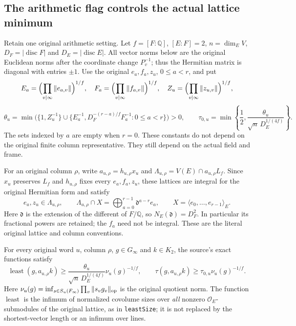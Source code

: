 \subsection{The arithmetic flag controls the actual lattice minimum}
\label{global-gram-arithmetic-minimum}

Retain one original arithmetic setting.  Let $f=[F:\mathbb Q]$,
$[E:F]=2$, $n=\dim_E V$, $D_F=|\operatorname{disc}F|$ and
$D_E=|\operatorname{disc}E|$.  All vector norms below are the
original Euclidean norms after the coordinate change $P_v^{-1}$;
thus the Hermitian matrix is diagonal with entries $\pm1$.
Use the original $e_a,f_a,z_u$, $0\le a<r$, and put
\[
 E_a=\Bigl(\prod_{v\mid\infty}\|e_{a,v}\|\Bigr)^{1/f},\quad
 F_a=\Bigl(\prod_{v\mid\infty}\|f_{a,v}\|\Bigr)^{1/f},\quad
 Z_u=\Bigl(\prod_{v\mid\infty}\|z_{u,v}\|\Bigr)^{1/f},
\]
\begin{equation}\label{global-gram-minimum-constant}
 \theta_u=\min\bigl(\{1,Z_u^{-1}\}\cup
    \{E_a^{-1},D_F^{-(r-a)/f}F_a^{-1}:0\le a<r\}\bigr)>0,
 \qquad
 \tau_{0,u}=\min\left\{\frac12,
              \frac{\theta_u}{\sqrt n\,D_E^{1/(4f)}}\right\}.
\end{equation}
The sets indexed by $a$ are empty when $r=0$.  These constants
do not depend on the original finite column representative.
They still depend on the actual field and frame.

For an original column $\rho$, write
$a_{u,\rho}=h_{u,\rho}x_u$ and
$\Lambda_{u,\rho}=V(E)\cap a_{u,\rho}L_f$.  Since $x_u$ preserves
$L_f$ and $h_{u,\rho}$ fixes every $e_a,f_a,z_u$, these lattices
are integral for the original Hermitian form and satisfy
\begin{equation}\label{global-gram-minimum-flag}
 e_a,z_u\in\Lambda_{u,\rho},\qquad
 \Lambda_{u,\rho}\cap X=\bigoplus_{a=0}^{r-1}
        \mathfrak d^{a-r}e_a,\qquad X=\langle e_0,\ldots,e_{r-1}\rangle_E.
\end{equation}
Here $\mathfrak d$ is the extension of the different of $F/\mathbb Q$,
so $N_E(\mathfrak d)=D_F^2$.  In particular its fractional powers
are retained; the $f_a$ need not be integral.
These are the literal original lattice and column conventions.
\cite{global-gram-minimum-source}

\begin{theorem}
\label{global-gram-actual-minimum-theorem}
For every original word $u$, column $\rho$, $g\in G_\infty$ and
$k\in K_2$, the source's exact functions satisfy
\begin{equation}\label{global-gram-actual-minimum}
 \operatorname{least}(g,a_{u,\rho}k)
       \ge\frac{\theta_u}{\sqrt n\,D_E^{1/(4f)}}
                      \nu_u(g)^{-1/f},\qquad
 \tau(g,a_{u,\rho}k)\ge\tau_{0,u}\nu_u(g)^{-1/f}.
\end{equation}
Here $\nu_u(g)=\inf_{s\in S_u(F_\infty)}\prod_v\|s_vg_v\|_{\rm op}$
is the original quotient norm.  The function
$\operatorname{least}$ is the infimum of normalized covolume
sizes over \emph{all} nonzero $\mathcal O_E$-submodules of the
original lattice, as in \texttt{leastSize}; it is not replaced
by the shortest-vector length or an infimum over lines.
\end{theorem}

